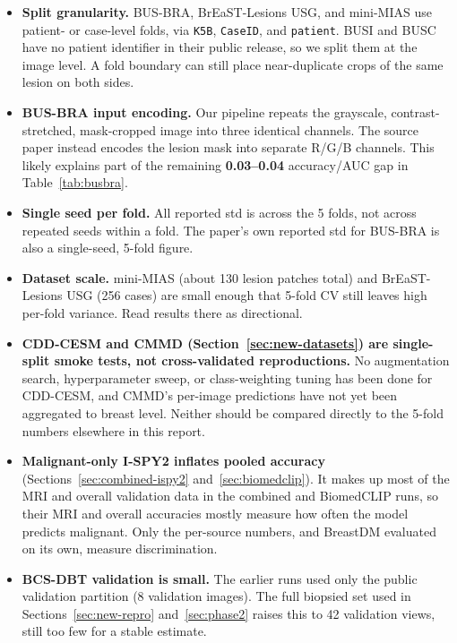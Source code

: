 \documentclass[11pt]{article}
\begin{document}
\begin{itemize}
  \item \textbf{Split granularity.} BUS-BRA, BrEaST-Lesions USG, and
    mini-MIAS use patient- or case-level folds, via \texttt{K5B},
    \texttt{CaseID}, and \texttt{patient}. BUSI and BUSC have no patient
    identifier in their public release, so we split them at the image
    level. A fold boundary can still place near-duplicate crops of the
    same lesion on both sides.
  \item \textbf{BUS-BRA input encoding.} Our pipeline repeats the
    grayscale, contrast-stretched, mask-cropped image into three identical
    channels. The source paper instead encodes the lesion mask into
    separate R/G/B channels. This likely explains part of the remaining
    \textbf{0.03--0.04} accuracy/AUC gap in Table~\ref{tab:busbra}.
  \item \textbf{Single seed per fold.} All reported std is across the 5
    folds, not across repeated seeds within a fold. The paper's own
    reported std for BUS-BRA is also a single-seed, 5-fold figure.
  \item \textbf{Dataset scale.} mini-MIAS (about 130 lesion patches total)
    and BrEaST-Lesions USG (256 cases) are small enough that 5-fold CV
    still leaves high per-fold variance. Read results there as
    directional.
  \item \textbf{CDD-CESM and CMMD (Section~\ref{sec:new-datasets}) are
    single-split smoke tests, not cross-validated reproductions.} No
    augmentation search, hyperparameter sweep, or class-weighting tuning
    has been done for CDD-CESM, and CMMD's per-image predictions have not
    yet been aggregated to breast level. Neither should be compared
    directly to the 5-fold numbers elsewhere in this report.
  \item \textbf{Malignant-only I-SPY2 inflates pooled accuracy}
    (Sections~\ref{sec:combined-ispy2} and~\ref{sec:biomedclip}). It
    makes up most of the MRI and overall validation data in the combined
    and BiomedCLIP runs, so their MRI and overall accuracies mostly
    measure how often the model predicts malignant. Only the per-source
    numbers, and BreastDM evaluated on its own, measure discrimination.
  \item \textbf{BCS-DBT validation is small.} The earlier runs used only the
    public validation partition (8 validation images). The full biopsied set
    used in Sections~\ref{sec:new-repro} and~\ref{sec:phase2} raises this
    to 42 validation views, still too few for a stable estimate.

\end{itemize}
\end{document}

